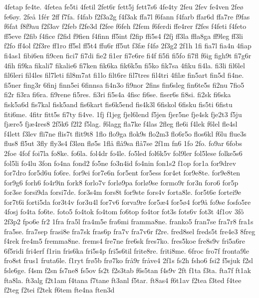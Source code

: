 4fetap
fe4te.
4fetea
fe5ti
4fetil
2fet6r
fett5j
fett7s6
4fe4ty
2feu
2fev
fe4ven
2fe^^f8
fe6^^f8y.
2fe^^e5
1f^^e9r
2ff
f7fa.
f4fab
f2f3a2g
f4f3ak
ffa7l
f6fann
f4farb
ffar6d
ffa7re
f9fas
f6fat
f8f9au
f2f3av
f2feb
f2fe3d
f2fee
f6feh
f2fem
f6ferdi
ffe4rer
f2fes
f4feti
f4feto
ff5eve
f2fib
f4fice
f2fid
f9fien
f4finn
ff5int
f2fip
ffi5s4
f2fj
ff3la
ffla8ga
ff9leg
ff3li
f2fo
ff4ol
f2f3re
ff1ro
ff5sl
ff5t4
ffu6r
ff5ut
f3f^^e6
f4f^^f8
2f3g2
2f1h
1fi
fia7l
fia4n
4fiap
fi4as1
fibi6en
fi9cen
fici7
fi7di
fie2
fi1er
fi7e6re
fi4f
fi5fi
fi5fo
fi7fl
f6ig
figh9t
fi7g6r
4fih
fi9ka
fikali7
fikalie6
fi7ken
fik6ka
fik6k5n
fi5ko
fik7sa
4fiku
fi4la.
fi3li
fil6lel
fil6leri
fil4les
fil7leti
fil8m7at
fi1lo
filt6re
fil7tres
fil4tri
4fil^^e6
fin5art
fin5d
fi4ne.
fi5ner
fing3r
6finj
finn5ei
6finnsa
fi4n3o
fi9nor
2fins
fin6sleg
fin6te5s
fi2nu
7fio5
fi2r
fi3ra
fi6ra.
fi9rene
fi5res.
fi3ri
fi5s4a
4fisc
fi6se.
fiser6s
fi8si.
fi2sk
fi6ska
fisk5a6d
fis7kal
fisk5and
fis6kart
fis6k5end
fis4k3l
6fiskol
6fisku
fis5ti
6fistu
fiti6me.
4fitr
fitt5s
fi7ty
fi4ve.
1fj
f1jeg
fjel6lend
f5jen
fjer5ne
fje4sk
fje2t3
f5ju
fj^^e6re5
fj^^e64res8
2f5k6
f2l2
f5lag.
f6lagg
fla7ke
f4las
2fleg
fle6i
f4lek
f6lel
fle4sl
f4lett
f3lev
fli7ne
flis7t
flit9t8
1flo
flo9ga
flok9s
flo2m3
flo6r5o
flos6kl
f6lu
flue3s
flus8
fl5ut
3fly
fly3s4
f3l^^f8n
fl^^f85s
1fl^^e5
fl^^e59sa
fl^^e57se
2f1m
fn6
1fo
2fo.
fo9ar
6fobs
2foe
4fof
foi7la
fo8ke.
fo6la.
fol4dr
fo4le.
fo5led
fol6k5v
fol9ler
fol5lese
folke5s6
fol5li
fo4lu
3fon
fo4na
fond2
fo5ne
fo3n4id
fo4nin
fon1s2
f1op
for1a
for9drev
for7dro
for5d6u
fo6re.
for9ei
for7e6n
for5ent
for5ess
for4et
for9e8te.
for9e8ten
for9g6
forh6
fo4r9in
fork8
forlo7v
forl^^f89pa
forl^^f89se
formo9r
for3n
foro6
for5p
for3se
forsi9da
forsi7de.
for3s4m
fors8t
for9ste
fors4v
forta8le.
for5t6e
fortei9e
for7t6i
forti5da
for3t4v
for3u4l
for7v6
forva9re
for5^^e64
for5^^f84
for9^^e5
fo9se
fosfo5re
4fosj
fo4ta
fo6te.
foto5
fo4tok
fo4tom
fo6top
fo4tor
fot3s
fots6v
fot3t
4f1ov
3f^^f4
2f3p2
fpo6e
fr2
1fra
fra5l
fra4m5e
fra6mi
framma8ne.
franko5
fran7se
fra7r8
fra1s
fra5se.
fra7sep
frasi8e
fra7sk
fras6p
fra7v
fra7v6r
f2re.
fred8sel
freds5t
fre4e3
8freg
f4rek
fre4m5
fremma8ne.
frems4
fre7ne
fre6sk
fres7ko.
fres5koe
fre8s9v
fri5a6re
6f5ridi
fri4erf
f1rin
fris6ka
fri5s4p
fri5s6til
frite8re.
friti8me.
6froc
fro7f
fronta9le
fro8st
frus1
fruta6le.
f1ryt
fr^^f85b
fr^^f87ko
fr^^e59r
fr^^e5ve4
2f1s
fs2h
fsho6
fsi2
f5sjuk
f2sl
fsle6ge.
f4sm
f2sn
fs7ne8
fs5ov
fs2t
f2s3tab
f6s5tan
f4s9v
2ft
f1ta
f3ta.
fta7f
ft1ak
fta8la.
ft3alg
f2t1am
f4tana
f7tane
ft3anl
f5tar.
ft8as4
f6t1av
f2tea
f3ted
f4tee
f2teg
f2tei
f2tek
f6tem
fte4na
ften3d
